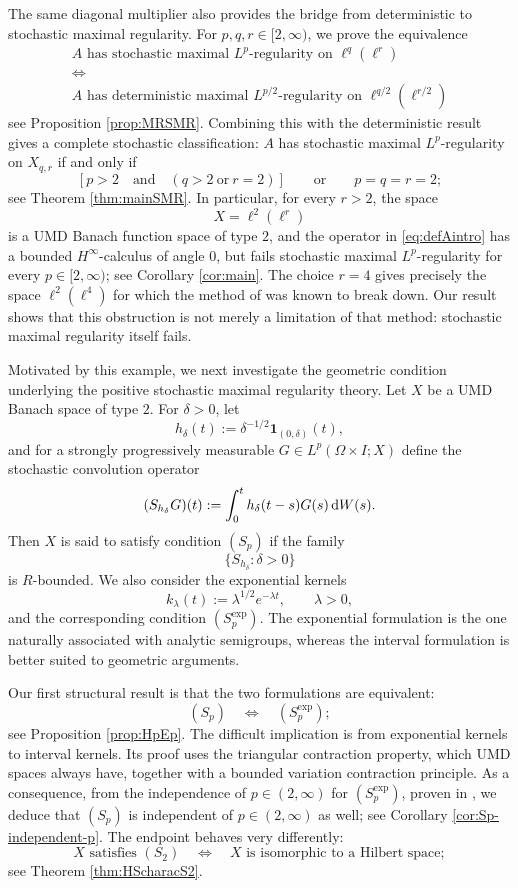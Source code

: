 \documentclass{amsart}
\theoremstyle{plain}
\theoremstyle{remark}
\theoremstyle{plain}
\numberwithin{equation}{section}
\newcommand{\1}{\mathbf 1}
\newcommand{\dd}{\,{\rm d}}
\begin{document}
The same diagonal multiplier also provides the bridge from deterministic
to stochastic maximal regularity. For $p,q,r\in[2,\infty)$, we prove
the equivalence
\[
\begin{gathered}
A\text{ has stochastic maximal $L^p$-regularity on }
\ell^q(\ell^r)
\\
\Longleftrightarrow
\\
A\text{ has deterministic maximal $L^{p/2}$-regularity on }
\ell^{q/2}(\ell^{r/2})
\end{gathered}
\]
see Proposition \ref{prop:MRSMR}. Combining this with the deterministic result gives a complete stochastic classification: $A$ has stochastic maximal $L^p$-regularity on $X_{q,r}$ if and only if
\[
\left[
        p>2
        \quad\text{and}\quad
        (q>2\ \text{or}\ r=2)
\right]
\qquad\text{or}\qquad
        p=q=r=2;
\]
see Theorem \ref{thm:mainSMR}. In particular, for every $r>2$, the space
\[
        X=\ell^2(\ell^r)
\]
is a UMD Banach function space of type $2$, and the operator in \eqref{eq:defAintro} has a bounded $H^\infty$-calculus of angle $0$, but fails stochastic maximal $L^p$-regularity for every $p\in[2,\infty)$; see Corollary \ref{cor:main}. The choice $r=4$ gives precisely the space $\ell^2(\ell^4)$ for which the method of \cite{NVW-Rbounded} was known to break down. Our result shows that this obstruction is not merely a limitation of that method: stochastic maximal regularity itself fails.

\medskip

Motivated by this example, we next investigate the geometric condition underlying the positive stochastic maximal regularity theory. Let $X$ be a UMD Banach space of type $2$. For $\delta>0$, let
\[
        h_\delta(t):=\delta^{-1/2}\mathbf 1_{(0,\delta)}(t),
\]
and for a strongly progressively measurable $G \in L^p(\Omega\times I;X)$ define the stochastic convolution operator 
\[
        (S_{h_\delta}G)(t)
        :=
        \int_0^t h_\delta(t-s)G(s)\dd W(s).
\]
Then $X$ is said to satisfy condition
$(S_p)$ if the family
\[
        \{S_{h_\delta}:\delta>0\}
\]
is $R$-bounded. We also consider the exponential kernels
\[
        k_\lambda(t):=\lambda^{1/2}e^{-\lambda t},
        \qquad \lambda>0,
\]
and the corresponding condition $(S_p^{\exp})$. The exponential formulation is the one naturally associated with analytic semigroups, whereas the interval formulation is better suited to geometric arguments.

Our first structural result is that the two formulations are equivalent:
\[
        (S_p)\quad\Longleftrightarrow\quad(S_p^{\exp});
\]
see Proposition \ref{prop:HpEp}. The difficult implication is from exponential kernels to interval kernels. Its proof uses the triangular contraction property, which UMD spaces always have, together with a bounded variation contraction principle. As a consequence, from the independence of $p\in(2,\infty)$ for $(S_p^{\exp})$, proven in \cite{LoVer}, we deduce that $(S_p)$ is independent of $p\in(2,\infty)$ as well; see Corollary \ref{cor:Sp-independent-p}. The endpoint behaves very differently:
\[
        X\text{ satisfies }(S_2)        \quad\Longleftrightarrow\quad        X\text{ is isomorphic to a Hilbert space};
\]
see Theorem \ref{thm:HScharacS2}. 
\end{document}
